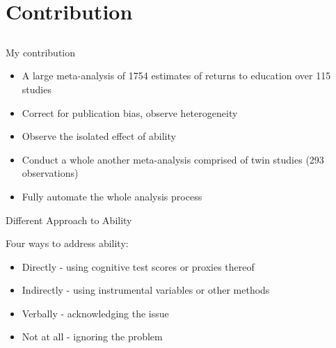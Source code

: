 \documentclass{beamer} %
\begin{document}
\section{Contribution}
\subsection{}

\begin{frame}{My contribution}

    \begin{itemize}
        \item A large meta-analysis of 1754 estimates of returns to education over 115 studies
        \item Correct for publication bias, observe heterogeneity
        \item Observe the isolated effect of ability
        \item Conduct a whole another meta-analysis comprised of twin studies (293 observations)
        \item Fully automate the whole analysis process
    \end{itemize}

\end{frame}




\begin{frame}{Different Approach to Ability}

    Four ways to address ability:
    \vspace{0.3cm}

    \begin{itemize}
        \item Directly - using cognitive test scores or proxies thereof
        \item Indirectly - using instrumental variables or other methods
        \item Verbally - acknowledging the issue
        \item Not at all - ignoring the problem
    \end{itemize}

\end{frame}
\end{document}
